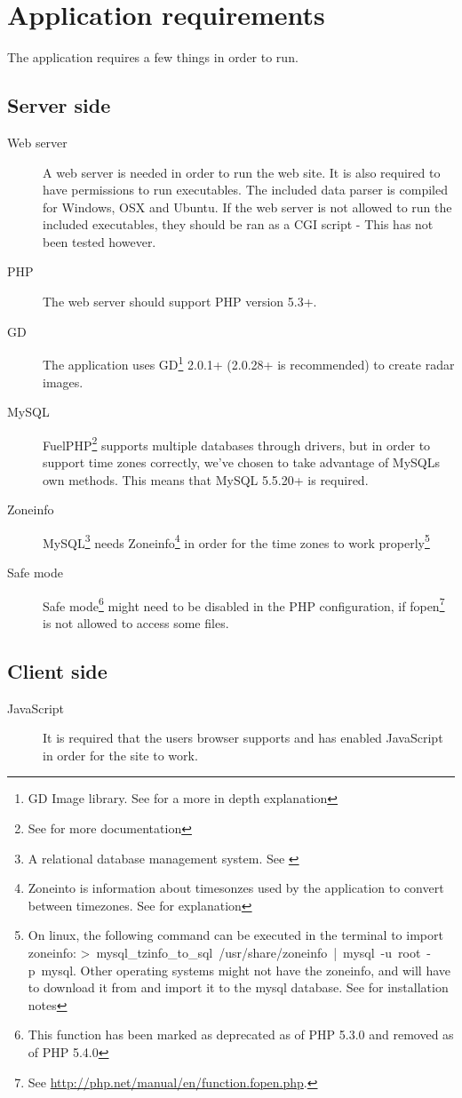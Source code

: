 \chapter{Application requirements}
\label{sec:application_requirements}
The application requires a few things in order to run.

\section{Server side}
\label{sec:server_side}
\begin{description}
\item[Web server] A web server is needed in order to run the web site. It is also required to have permissions to run executables. The included data parser is compiled for Windows, OSX and Ubuntu. If the web server is not allowed to run the included executables, they should be ran as a CGI script - This has not been tested however.
\item[PHP] The web server should support PHP version 5.3+.
\item[GD] The application uses GD\footnote{GD Image library. See \cite{GD} for a more in depth explanation} 2.0.1+ (2.0.28+ is recommended) to create radar images.
\item[MySQL] FuelPHP\footnote{See \cite{FuelPHP} for more documentation} supports multiple databases through drivers, but in order to support time zones correctly, we've chosen to take advantage of MySQLs own methods. This means that MySQL 5.5.20+ is required.
\item[Zoneinfo] MySQL\footnote{A relational database management system. See \cite{MySQL}} needs Zoneinfo\footnote{Zoneinto is information about timesonzes used by the application to convert between timezones. See \cite{Zoneinfo} for explanation} in order for the time zones to work properly\footnote{On linux, the following command can be executed in the terminal to import zoneinfo: \mbox{\textsf{> mysql\_tzinfo\_to\_sql /usr/share/zoneinfo | mysql -u root -p mysql}}. Other operating systems might not have the zoneinfo, and will have to download it from \cite{Zoneinfo_download} and import it to the mysql database. See \cite{Zoneinfo_install} for installation notes}
\item[Safe mode] Safe mode\footnote{This function has been marked as deprecated as of PHP 5.3.0 and removed as of PHP 5.4.0} might need to be disabled in the PHP configuration, if \textsf{fopen}\footnote{See \url{http://php.net/manual/en/function.fopen.php}.} is not allowed to access some files.
\end{description}

\section{Client side}
\label{sec:client_side}
\begin{description}
\item[JavaScript] It is required that the users browser supports and has enabled JavaScript in order for the site to work.
\end{description}